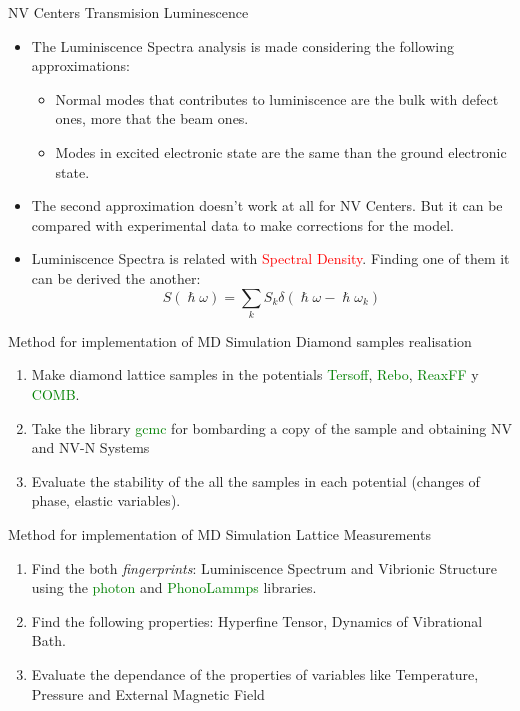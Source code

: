 \documentclass[11pt]{beamer}
\begin{document}
\begin{frame}{NV Centers Transmision Luminescence}
  \begin{itemize}
    \item The Luminiscence Spectra analysis is made considering the following approximations:
    \begin{itemize}
        \item Normal modes that contributes to luminiscence are the bulk with defect ones, more that the beam ones.
        \item Modes in excited electronic state are the same than the ground electronic state.
    \end{itemize}
    \item The second approximation doesn't work at all for NV Centers. But it can be compared with experimental data to make corrections for the model.
    \item Luminiscence Spectra is related with \textcolor{red}{Spectral Density}. Finding one of them it can be derived the another:
    \begin{equation}S(\hslash\omega)=\sum_k S_k\delta(\hslash\omega-\hslash\omega_k)\end{equation}
 \end{itemize}
\end{frame}
\begin{frame}{Method for implementation of MD Simulation}
 Diamond samples realisation
  \begin{enumerate}
    \item Make diamond lattice samples in the potentials \textcolor{green}{Tersoff}, \textcolor{green}{Rebo}, \textcolor{green}{ReaxFF} y \textcolor{green}{COMB}.
    \item Take the library \textcolor{green}{gcmc} for bombarding a copy of the sample and obtaining NV and NV-N Systems
    \item Evaluate the stability of the all the samples in each potential (changes of phase, elastic variables).
 \end{enumerate}
\end{frame}
\begin{frame}{Method for implementation of MD Simulation}
  Lattice Measurements
  \begin{enumerate}
    \item Find the both \textit{fingerprints}: Luminiscence Spectrum and Vibrionic Structure using the \textcolor{green}{photon} and \textcolor{green}{PhonoLammps} libraries.
    \item Find the following properties: Hyperfine Tensor, Dynamics of Vibrational Bath.
    \item Evaluate the dependance of the properties of variables like Temperature, Pressure and External Magnetic Field
 \end{enumerate}
\end{frame}
\end{document}
